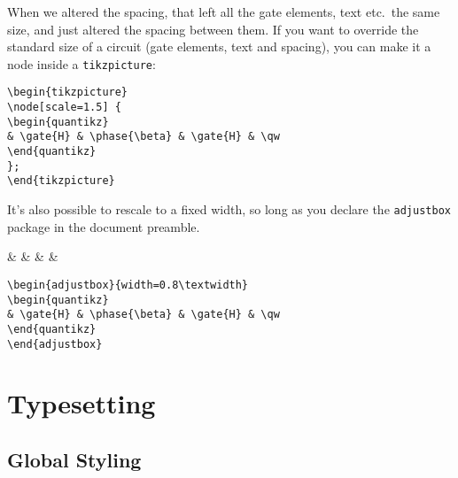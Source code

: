 \documentclass[aps,pra,10pt,nofootinbib]{revtex4}
\begin{document}
When we altered the spacing, that left all the gate elements, text etc.\ the same size, and just altered the spacing between them. If you want to override the standard size of a circuit (gate elements, text and spacing), you can make it a node inside a \verb!tikzpicture!:
\begin{Code}
\begin{center}
\end{center}
\tcblower
\begin{lstlisting}
\begin{tikzpicture}
\node[scale=1.5] {
\begin{quantikz}
& \gate{H} & \phase{\beta} & \gate{H} & \qw
\end{quantikz}
};
\end{tikzpicture}
\end{lstlisting}
\end{Code}
It's also possible to rescale to a fixed width, so long as you declare the \verb!adjustbox! package in the document preamble.
\begin{Code}
\begin{center}
\begin{adjustbox}{width=0.8\textwidth}
\begin{quantikz}
&  & \phase{\beta} &  & \qw
\end{quantikz}
\end{adjustbox}
\end{center}
\tcblower
\begin{lstlisting}
\begin{adjustbox}{width=0.8\textwidth}
\begin{quantikz}
& \gate{H} & \phase{\beta} & \gate{H} & \qw
\end{quantikz}
\end{adjustbox}
\end{lstlisting}
\end{Code}


\section{Typesetting}

\subsection{Global Styling}
\end{document}
